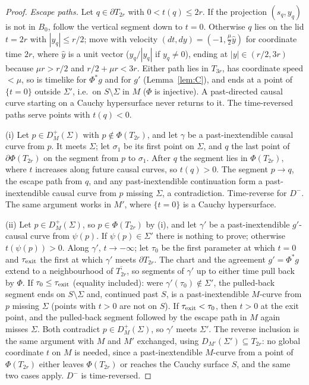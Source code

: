 \begin{proof}
\emph{Escape paths.} Let $q\in\partial T_{2r}$ with $0<t(q)\le2r$. If the
projection $(s_q,y_q)$ is not in $B_0$, follow the vertical segment down to
$t=0$. Otherwise $q$ lies on the lid $t=2r$ with $|y_q|\le r/2$; move with
velocity $(dt,dy)=(-1,\tfrac\mu2\hat y)$ for coordinate time $2r$, where $\hat y$
is a unit vector ($y_q/|y_q|$ if $y_q\neq0$), ending at $|y|\in(r/2,3r)$
because $\mu r>r/2$ and $r/2+\mu r<3r$. Either path lies in $T_{3r}$, has
coordinate speed $<\mu$, so is timelike for $\Phi^*g$ and for $g'$
(Lemma~\ref{lem:C}), and ends at a point of $\{t=0\}$ outside $\Sigma'$, i.e.\ on
$S\setminus\Sigma$ in $M$ ($\Phi$ is injective). A past-directed causal curve
starting on a Cauchy hypersurface never returns to it. The time-reversed paths
serve points with $t(q)<0$.

(i) Let $p\in D^+_M(\Sigma)$ with $p\notin\Phi(T_{2r})$, and let $\gamma$ be a
past-inextendible causal curve from $p$. It meets $\Sigma$; let $\sigma_1$ be
its first point on $\Sigma$, and $q$ the last point of $\partial\Phi(T_{2r})$ on
the segment from $p$ to $\sigma_1$. After $q$ the segment lies in
$\Phi(T_{2r})$, where $t$ increases along future causal curves, so $t(q)>0$.
The segment $p\to q$, the escape path from $q$, and any past-inextendible
continuation form a past-inextendible causal curve from $p$ missing $\Sigma$, a
contradiction. Time-reverse for $D^-$. The same argument works in $M'$, where
$\{t=0\}$ is a Cauchy hypersurface.

(ii) Let $p\in D^+_M(\Sigma)$, so $p\in\Phi(T_{2r})$ by (i), and let
$\gamma'$ be a past-inextendible $g'$-causal curve from $\psi(p)$. If
$\psi(p)\in\Sigma'$ there is nothing to prove; otherwise $t(\psi(p))>0$. Along
$\gamma'$, $t\to-\infty$; let $\tau_0$ be the first parameter at which $t=0$ and
$\tau_{\rm exit}$ the first at which $\gamma'$ meets $\partial T_{2r}$. The chart
and the agreement $g'=\Phi^*g$ extend to a neighbourhood of
$\overline{T_{2r}}$, so segments of $\gamma'$ up to either time pull back by
$\Phi$. If $\tau_0\le\tau_{\rm exit}$ (equality included): were
$\gamma'(\tau_0)\notin\Sigma'$, the pulled-back segment ends on $S\setminus\Sigma$
and, continued past $S$, is a past-inextendible $M$-curve from $p$ missing
$\Sigma$ (points with $t>0$ are not on $S$). If $\tau_{\rm exit}<\tau_0$, then
$t>0$ at the exit point, and the pulled-back segment followed by the escape
path in $M$ again misses $\Sigma$. Both contradict $p\in D^+_M(\Sigma)$, so $\gamma'$
meets $\Sigma'$. The reverse inclusion is the same argument with $M$ and $M'$
exchanged, using $D_{M'}(\Sigma')\subseteq T_{2r}$: no global coordinate $t$ on
$M$ is needed, since a past-inextendible $M$-curve from a point of
$\Phi(T_{2r})$ either leaves $\Phi(T_{2r})$ or reaches the Cauchy surface $S$,
and the same two cases apply. $D^-$ is time-reversed.


\end{proof}
